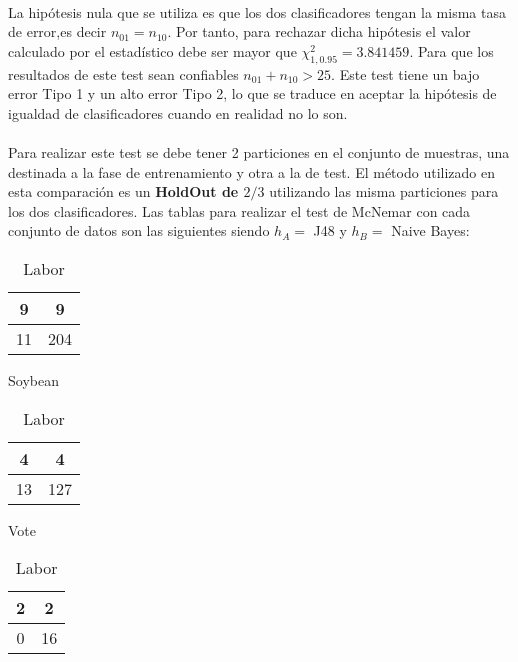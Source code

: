 \documentclass[10pt, a4paper,spanish]{article}
\begin{document}
		\paragraph{}
		La hipótesis nula que se utiliza es que los dos clasificadores tengan la misma tasa de error,es decir $n_{01} = n_{10}$. Por tanto, para rechazar dicha hipótesis el valor calculado por el estadístico debe ser mayor que $\chi^2_{1,0.95} = 3.841459$. Para que los resultados de este test sean confiables $n_{01} + n_{10} > 25$. Este test tiene un bajo error Tipo 1 y un alto error Tipo 2, lo que se traduce en aceptar la hipótesis de igualdad de clasificadores cuando en realidad no lo son.


		\paragraph{}
		Para realizar este test se debe tener 2 particiones en el conjunto de muestras, una destinada a la fase de entrenamiento y otra a la de test. El método utilizado en esta comparación es un \textbf{HoldOut de $2/3$} utilizando las misma particiones para los dos clasificadores. Las tablas para realizar el test de McNemar con cada conjunto de datos son las siguientes siendo $h_A = $ J48 y $h_B = $ Naive Bayes:


		\begin{table}[ht]
			\begin{minipage}[b]{0.3\linewidth}
				\centering
				\begin{tabular}{ | c | c | }
					\hline
					9 & 9 \\ \hline
					11 & 204 \\
					\hline
				\end{tabular}
				\caption{Soybean}
			\end{minipage}\hfill
			\begin{minipage}[b]{0.3\linewidth}
				\centering
				\begin{tabular}{ | c | c | }
					\hline
					4 & 4 \\ \hline
					13 & 127 \\
					\hline
				\end{tabular}
				\caption{Vote}
			\end{minipage}\hfill
			\begin{minipage}[b]{0.3\linewidth}
				\centering
				\begin{tabular}{ | c | c | }
					\hline
					2 & 2 \\ \hline
					0 & 16 \\
					\hline
				\end{tabular}
				\caption{Labor}
			\end{minipage}
		\end{table}
\end{document}
